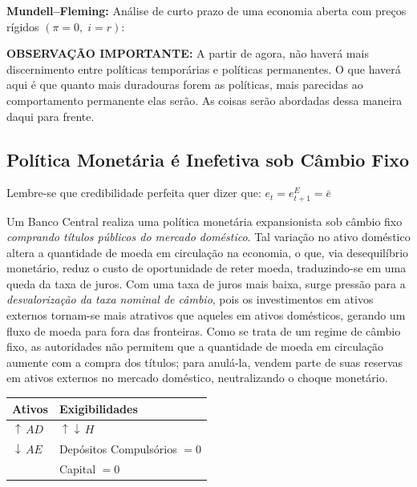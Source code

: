 \documentclass[a4paper,12pt]{article}[abntex2]
\begin{document}
\textbf{Mundell--Fleming:} Análise de curto prazo de uma economia aberta com preços rígidos $(\pi = 0,\; i = r)$:


\textbf{OBSERVAÇÃO IMPORTANTE:} A partir de agora, não haverá mais discernimento entre políticas temporárias e políticas permanentes.  
O que haverá aqui é que quanto mais duradouras forem as políticas, mais parecidas ao comportamento permanente elas serão.  
As coisas serão abordadas dessa maneira daqui para frente.


\subsection{\textbf{Política Monetária é Inefetiva sob Câmbio Fixo}}


Lembre-se que credibilidade perfeita quer dizer que: $e_{t}=e_{t+1}^{E}=\bar{e}$

Um Banco Central realiza uma política monetária expansionista sob câmbio fixo \emph{comprando títulos públicos do mercado doméstico}.  
Tal variação no ativo doméstico altera a quantidade de moeda em circulação na economia, o que, via desequilíbrio monetário, reduz o custo de oportunidade de reter moeda, traduzindo-se em uma queda da taxa de juros.  
Com uma taxa de juros mais baixa, surge pressão para a \emph{desvalorização da taxa nominal de câmbio}, pois os investimentos em ativos externos tornam-se mais atrativos que aqueles em ativos domésticos, gerando um fluxo de moeda para fora das fronteiras.  
Como se trata de um regime de câmbio fixo, as autoridades não permitem que a quantidade de moeda em circulação aumente com a compra dos títulos; para anulá-la, vendem parte de suas reservas em ativos externos no mercado doméstico, neutralizando o choque monetário.

\begin{center}
\begin{tabular}{|l|l|}
\hline
\textbf{Ativos} & \textbf{Exigibilidades} \\ \hline
$\uparrow\,AD$ & $\uparrow\!\downarrow\,H$ \\ \hline
$\downarrow\,AE$ & Depósitos Compulsórios $=0$ \\ \hline
& Capital $=0$ \\ \hline
\end{tabular}
\end{center}
\end{document}
